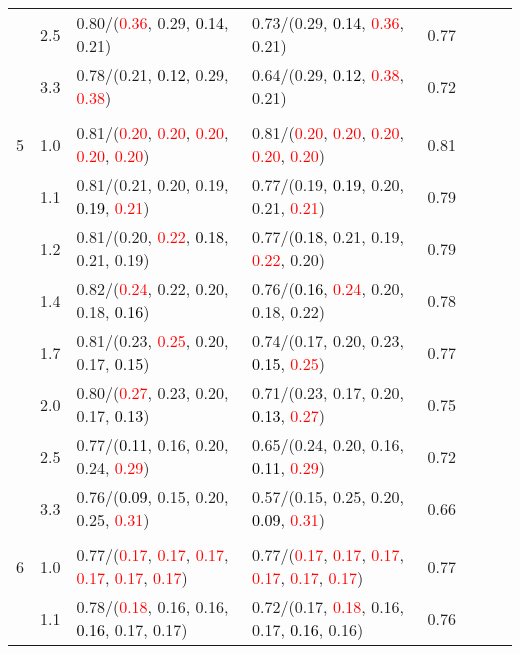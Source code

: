 \documentclass[10pt,a4paper]{report}
\begin{document}
\begin{table}[!htbp]
\begin{center}
{\begin{tabular}{ccllcccc}
			&2.5&0.80/(\textcolor{red}{0.36}, 0.29, \textcolor{black}{0.14}, 0.21)&0.73/(0.29, \textcolor{black}{0.14}, \textcolor{red}{0.36}, 0.21)&0.77\\
			&3.3&0.78/(0.21, \textcolor{black}{0.12}, 0.29, \textcolor{red}{0.38})&0.64/(0.29, \textcolor{black}{0.12}, \textcolor{red}{0.38}, 0.21)&0.72\\
			&&&&\\
			5			&1.0&0.81/(\textcolor{red}{0.20}, \textcolor{red}{0.20}, \textcolor{red}{0.20}, \textcolor{red}{0.20}, \textcolor{red}{0.20})&0.81/(\textcolor{red}{0.20}, \textcolor{red}{0.20}, \textcolor{red}{0.20}, \textcolor{red}{0.20}, \textcolor{red}{0.20})&0.81\\
			&1.1&0.81/(0.21, 0.20, 0.19, \textcolor{black}{0.19}, \textcolor{red}{0.21})&0.77/(0.19, \textcolor{black}{0.19}, 0.20, 0.21, \textcolor{red}{0.21})&0.79\\
			&1.2&0.81/(0.20, \textcolor{red}{0.22}, \textcolor{black}{0.18}, 0.21, 0.19)&0.77/(\textcolor{black}{0.18}, 0.21, 0.19, \textcolor{red}{0.22}, 0.20)&0.79\\
			&1.4&0.82/(\textcolor{red}{0.24}, 0.22, 0.20, 0.18, \textcolor{black}{0.16})&0.76/(\textcolor{black}{0.16}, \textcolor{red}{0.24}, 0.20, 0.18, 0.22)&0.78\\
			&1.7&0.81/(0.23, \textcolor{red}{0.25}, 0.20, 0.17, \textcolor{black}{0.15})&0.74/(0.17, 0.20, 0.23, \textcolor{black}{0.15}, \textcolor{red}{0.25})&0.77\\
			&2.0&0.80/(\textcolor{red}{0.27}, 0.23, 0.20, 0.17, \textcolor{black}{0.13})&0.71/(0.23, 0.17, 0.20, \textcolor{black}{0.13}, \textcolor{red}{0.27})&0.75\\
			&2.5&0.77/(\textcolor{black}{0.11}, 0.16, 0.20, 0.24, \textcolor{red}{0.29})&0.65/(0.24, 0.20, 0.16, \textcolor{black}{0.11}, \textcolor{red}{0.29})&0.72\\
			&3.3&0.76/(\textcolor{black}{0.09}, 0.15, 0.20, 0.25, \textcolor{red}{0.31})&0.57/(0.15, 0.25, 0.20, \textcolor{black}{0.09}, \textcolor{red}{0.31})&0.66\\
			&&&&\\
			6			&1.0&0.77/(\textcolor{red}{0.17}, \textcolor{red}{0.17}, \textcolor{red}{0.17}, \textcolor{red}{0.17}, \textcolor{red}{0.17}, \textcolor{red}{0.17})&0.77/(\textcolor{red}{0.17}, \textcolor{red}{0.17}, \textcolor{red}{0.17}, \textcolor{red}{0.17}, \textcolor{red}{0.17}, \textcolor{red}{0.17})&0.77\\
			&1.1&0.78/(\textcolor{red}{0.18}, 0.16, 0.16, \textcolor{black}{0.16}, 0.17, 0.17)&0.72/(0.17, \textcolor{red}{0.18}, 0.16, 0.17, \textcolor{black}{0.16}, 0.16)&0.76\\

\end{tabular}}
\end{center}
\end{table}
\end{document}
